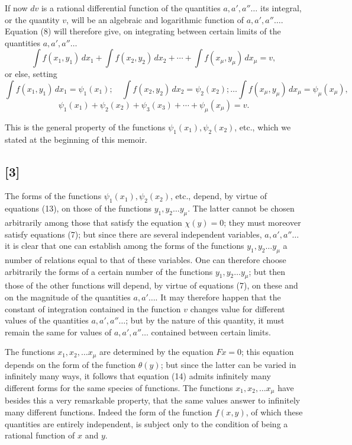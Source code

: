 \documentclass{article}
\begin{document}
If now $dv$ is a rational differential function of the quantities $a, a', a'' \ldots$ its integral, or the quantity $v$, will be an algebraic and logarithmic function of $a, a', a'' \ldots$. Equation (8) will therefore give, on integrating between certain limits of the quantities $a, a', a'' \ldots$
\[ \int f(x_1, y_1)\,dx_1 + \int f(x_2, y_2)\,dx_2 + \cdots + \int f(x_\mu, y_\mu)\,dx_\mu = v, \tag{12} \]
or else, setting
\[ \int f(x_1, y_1)\,dx_1 = \psi_1(x_1); \quad \int f(x_2, y_2)\,dx_2 = \psi_2(x_2); \ldots \int f(x_\mu, y_\mu)\,dx_\mu = \psi_\mu(x_\mu), \tag{13} \]
\[ \psi_1(x_1) + \psi_2(x_2) + \psi_3(x_3) + \cdots + \psi_\mu(x_\mu) = v. \tag{14} \]

This is the general property of the functions $\psi_1(x_1), \psi_2(x_2)$, etc., which we stated at the beginning of this memoir.

\subsection*{[3]}

The forms of the functions $\psi_1(x_1), \psi_2(x_2)$, etc., depend, by virtue of equations (13), on those of the functions $y_1, y_2 \ldots y_\mu$. The latter cannot be chosen arbitrarily among those that satisfy the equation $\chi(y) = 0$; they must moreover satisfy equations (7); but since there are several independent variables, $a, a', a'' \ldots$ it is clear that one can establish among the forms of the functions $y_1, y_2 \ldots y_\mu$ a number of relations equal to that of these variables. One can therefore choose arbitrarily the forms of a certain number of the functions $y_1, y_2 \ldots y_\mu$; but then those of the other
functions will depend, by virtue of equations (7), on these and on the magnitude of the quantities $a, a' \ldots$. It may therefore happen that the constant of integration contained in the function $v$ changes value for different values of the quantities $a, a', a'' \ldots$; but by the nature of this quantity, it must remain the same for values of $a, a', a'' \ldots$ contained between certain limits.

The functions $x_1, x_2, \ldots x_\mu$ are determined by the equation $F x = 0$; this equation depends on the form of the function $\theta(y)$; but since the latter can be varied in infinitely many ways, it follows that equation (14) admits infinitely many different forms for the same species of functions. The functions $x_1, x_2, \ldots x_\mu$ have besides this a very remarkable property, that the same values answer to infinitely many different functions. Indeed the form of the function $f(x, y)$, of which these quantities are entirely independent, is subject only to the condition of being a rational function of $x$ and $y$.
\end{document}
